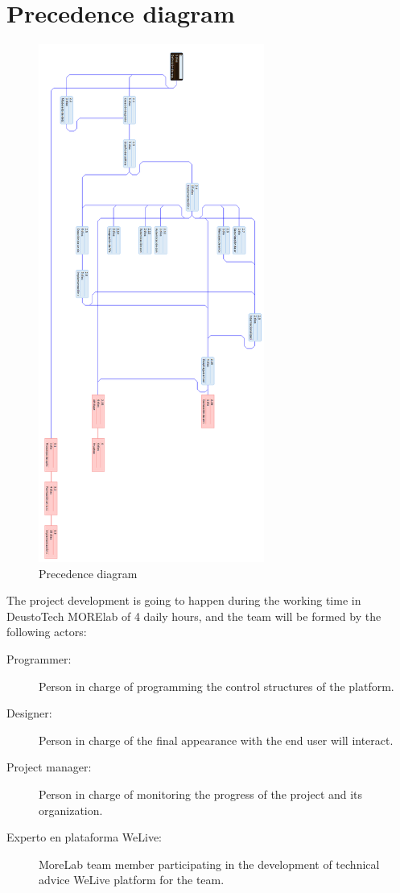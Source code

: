 \documentclass{DeustoFDP}
\begin{document}
\section{Precedence diagram}
\begin{figure}[H]
	\centering
	\includegraphics[width=210pt]{fig/precedencia}
	\caption{Precedence diagram}\label{fig:precedencediagram}
\end{figure}

The project development is going to happen during the working time in DeustoTech MORElab of 4 daily hours, and the team will be formed by the following actors:

\begin{description}
	\item[Programmer:] Person in charge of programming the control structures of the platform.
	\item[Designer:] Person in charge of the final appearance with the end user will interact.
	\item[Project manager:] Person in charge of monitoring the progress of the project and its organization.
	\item[Experto en plataforma WeLive:] MoreLab team member participating in the development of technical advice WeLive platform for the team.
\end{description}
\end{document}
